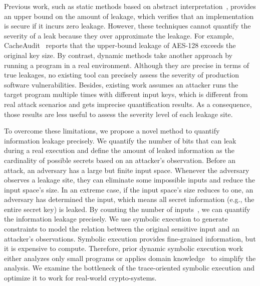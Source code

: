 Previous work, such as static methods based on abstract interpretation~\cite{182946,5207642}, provides an upper bound on the amount of leakage, which verifies that an implementation is secure if it incurs zero leakage.
However, these techniques cannot quantify the severity of a leak because they
over approximate the leakage. For example, CacheAudit~\cite{182946} 
reports that the upper-bound leakage of AES-128 exceeds the original key size. By contrast, dynamic methods take another approach by running a program in a real
environment. Although they are precise in terms of true leakages, no
existing tool can precisely assess the severity of production
software vulnerabilities. 
Besides, existing work 
assumes an attacker runs the target program multiple times with different
input keys, which is different from real attack scenarios and gets imprecise
quantification results. As a consequence, those results are less useful to 
assess the severity level of each leakage site.

To overcome these limitations, we propose a novel method to quantify information 
leakage precisely. We quantify the number of bits that can leak during a real 
execution and define the amount of leaked information as the cardinality of 
possible secrets based on an attacker's observation. Before an attack, an adversary has a large but finite input space. 
Whenever the adversary observes a leakage site, they can eliminate some impossible 
inputs and reduce the input space's size. In an extreme case, if the input space's size reduces to one, an adversary has determined the input, which means all secret information (e.g., the entire secret key) is
leaked. By counting the number of inputs~\cite{10.1007/11499107_24}, we can quantify the information leakage precisely.
We use symbolic execution to generate constraints to model the relation 
between the original sensitive input and an attacker's observations. 
Symbolic execution provides fine-grained information, but it is expensive
to compute. Therefore, prior dynamic symbolic
execution work~\cite{203878,236338,Brotzman19Casym} either analyzes only
small programs or applies domain knowledge~\cite{203878} to simplify the analysis. We
examine the bottleneck of the trace-oriented symbolic execution and optimize it
to work for real-world crypto-systems.

